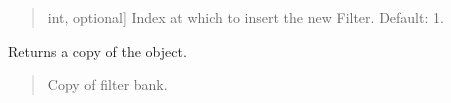 \documentclass[letterpaper,10pt,english]{sphinxmanual}
\begin{document}
\begin{fulllineitems}
\begin{fulllineitems}
\begin{quote}
\begin{description}
\begin{description}
\sphinxlineitem{\sphinxstylestrong{index}}{[}int, optional{]}
\sphinxAtStartPar
Index at which to insert the new Filter. Default: \sphinxhyphen{}1.

\end{description}

\end{description}\end{quote}

\end{fulllineitems}


\begin{fulllineitems}
\label{\detokenize{classes:dsptoolbox.classes.filterbank.FilterBank.copy}}
\pysigstartsignatures
{}
\pysigstopsignatures
\sphinxAtStartPar
Returns a copy of the object.
\begin{quote}\begin{description}
\begin{description}
\sphinxlineitem{\sphinxstylestrong{new\_sig}}{[}\sphinxtitleref{FilterBank}{]}
\sphinxAtStartPar
Copy of filter bank.

\end{description}

\end{description}\end{quote}

\end{fulllineitems}



\end{fulllineitems}
\end{document}
